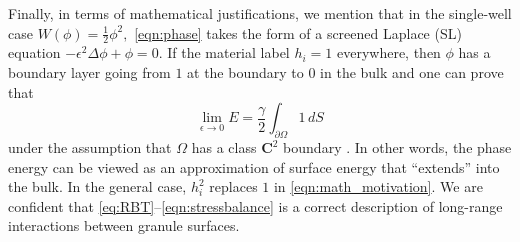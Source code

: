 Finally, in terms of mathematical justifications, we mention
that in the single-well case
$W(\phi) = \tfrac{1}{2}\phi^2,$ \eqref{eqn:phase} takes the form
of a screened Laplace (SL) equation $-\epsilon^2 \Delta \phi + \phi =0$.
If the material label $h_i = 1$ everywhere, then $\phi$
has a boundary layer going from $1$ at the boundary to $0$ in the bulk
and one can prove that 
\begin{equation}
\label{eqn:math_motivation}
\lim_{\epsilon \to 0} E = \frac{\gamma}{2} \int_{\partial \Omega} 1 \,dS
\end{equation}
under the assumption that $\Omega$ has a class $\mathbf{C}^2$ boundary \cite{}.
In other words, the phase energy can be viewed as an
approximation of surface energy that ``extends'' into the bulk.
In the general case, $h_i^2$ replaces $1$ in \eqref{eqn:math_motivation}.
We are confident that \eqref{eq:RBT}--\eqref{eqn:stressbalance}
is a correct description of long-range interactions between granule
surfaces.

